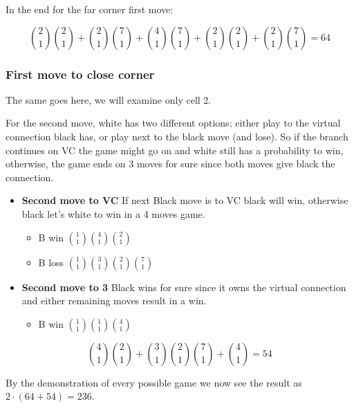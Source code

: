 In the end for the far corner first move:

$${2 \choose 1}{2 \choose 1} + {2 \choose 1}{7 \choose 1} + {4 \choose 1}{7 \choose 1} + {2 \choose 1}{2 \choose 1} + {2 \choose 1}{7 \choose 1} = 64$$

\subsubsection{First move to close corner}

The same goes here, we will examine only cell 2.

For the second move, white has two different options; either play to the virtual connection black has, or play next to the black move (and lose). So if the branch continues on VC the game might go on and white still has a probability to win, otherwise, the game ends on 3 moves for sure since both moves give black the connection.

\begin{itemize}
    \item \textbf{Second move to VC} If next Black move is to VC black will win, otherwise black let's white to win in a 4 moves game.
    \begin{itemize}
        \item B win ${1 \choose 1}{4 \choose 1}{2 \choose 1}$
        \item B loss ${1 \choose 1}{3 \choose 1}{2 \choose 1}{7 \choose 1}$
    \end{itemize}
    \item \textbf{Second move to 3} Black wins for sure since it owns the virtual connection and either remaining moves result in a win.
    \begin{itemize}
        \item B win ${1 \choose 1}{1 \choose 1}{4 \choose 1}$
    \end{itemize}
\end{itemize}

$${4 \choose 1}{2 \choose 1} + {3 \choose 1}{2 \choose 1}{7 \choose 1} + {4 \choose 1} = 54$$

By the demonstration of every possible game we now see the result as $2 \cdot (64 + 54) = 236$.